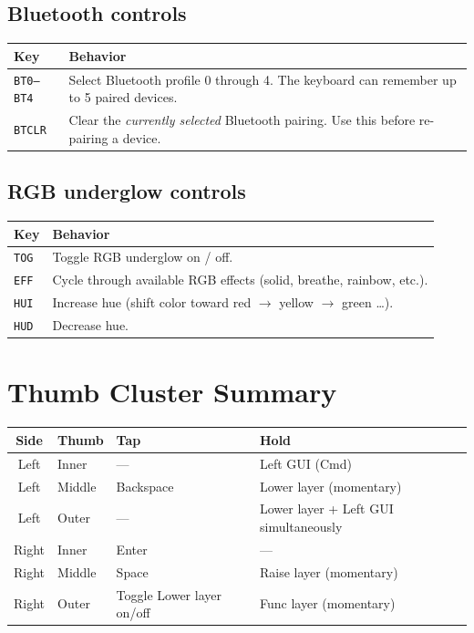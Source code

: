\documentclass[11pt, letterpaper]{article}
\begin{document}
\subsection*{Bluetooth controls}

\begin{tabular}{lp{9cm}}
\toprule
\textbf{Key}       & \textbf{Behavior} \\
\midrule
\texttt{BT0--BT4}  & Select Bluetooth profile 0 through 4. The keyboard
                     can remember up to 5 paired devices. \\
\texttt{BTCLR}     & Clear the \emph{currently selected} Bluetooth pairing.
                     Use this before re-pairing a device. \\
\bottomrule
\end{tabular}

\subsection*{RGB underglow controls}

\begin{tabular}{lp{9cm}}
\toprule
\textbf{Key}  & \textbf{Behavior} \\
\midrule
\texttt{TOG}  & Toggle RGB underglow on / off. \\
\texttt{EFF}  & Cycle through available RGB effects (solid, breathe, rainbow, etc.). \\
\texttt{HUI}  & Increase hue (shift color toward red $\to$ yellow $\to$ green \ldots). \\
\texttt{HUD}  & Decrease hue. \\
\bottomrule
\end{tabular}

\section{Thumb Cluster Summary}

\begin{center}
\begin{tabular}{clll}
\toprule
\textbf{Side} & \textbf{Thumb} & \textbf{Tap} & \textbf{Hold} \\
\midrule
Left  & Inner  & ---       & Left GUI (Cmd) \\
Left  & Middle & Backspace & Lower layer (momentary) \\
Left  & Outer  & ---       & Lower layer + Left GUI simultaneously \\
Right & Inner  & Enter     & --- \\
Right & Middle & Space     & Raise layer (momentary) \\
Right & Outer  & Toggle Lower layer on/off & Func layer (momentary) \\
\bottomrule
\end{tabular}
\end{center}
\end{document}
